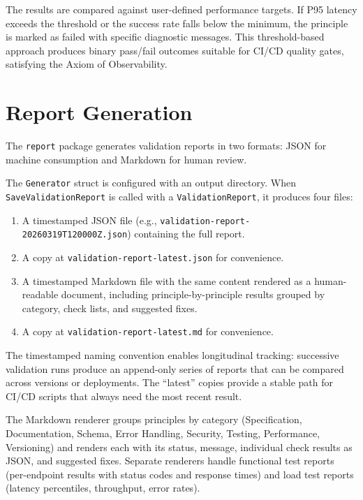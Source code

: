 The results are compared against user-defined performance targets. If P95 latency exceeds the threshold or the success rate falls below the minimum, the principle is marked as failed with specific diagnostic messages. This threshold-based approach produces binary pass/fail outcomes suitable for CI/CD quality gates, satisfying the Axiom of Observability.

\section{Report Generation}
\label{sec:report-generation}

The \texttt{report} package generates validation reports in two formats: JSON for machine consumption and Markdown for human review.

The \texttt{Generator} struct is configured with an output directory. When \texttt{SaveValidationReport} is called with a \texttt{ValidationReport}, it produces four files:

\begin{enumerate}
    \item A timestamped JSON file (e.g., \texttt{validation-report-20260319T120000Z.json}) containing the full report.
    \item A copy at \texttt{validation-report-latest.json} for convenience.
    \item A timestamped Markdown file with the same content rendered as a human-readable document, including principle-by-principle results grouped by category, check lists, and suggested fixes.
    \item A copy at \texttt{validation-report-latest.md} for convenience.
\end{enumerate}

The timestamped naming convention enables longitudinal tracking: successive validation runs produce an append-only series of reports that can be compared across versions or deployments. The ``latest'' copies provide a stable path for CI/CD scripts that always need the most recent result.

The Markdown renderer groups principles by category (Specification, Documentation, Schema, Error Handling, Security, Testing, Performance, Versioning) and renders each with its status, message, individual check results as JSON, and suggested fixes. Separate renderers handle functional test reports (per-endpoint results with status codes and response times) and load test reports (latency percentiles, throughput, error rates).

